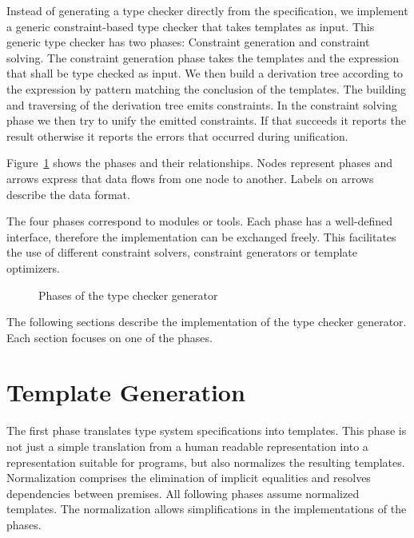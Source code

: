 Instead of generating a type checker directly from the specification,
we implement a generic constraint-based type checker that takes
templates as input. This generic type checker has two phases:
Constraint generation and constraint solving. The constraint
generation phase takes the templates and the expression that shall be
type checked as input. We then build a derivation tree according to
the expression by pattern matching the conclusion of the
templates. The building and traversing of the derivation tree emits
constraints. In the constraint solving phase we then try to unify the
emitted constraints. If that succeeds it reports the result otherwise
it reports the errors that occurred during unification.

Figure~\ref{fig:phases} shows the phases and their
relationships. Nodes represent phases and arrows express that data
flows from one node to another. Labels on arrows describe the data
format.

The four phases correspond to modules or tools. Each phase has a
well-defined interface, therefore the implementation can be exchanged
freely. This facilitates the use of different constraint solvers,
constraint generators or template optimizers.

\begin{figure}
\caption{Phases of the type checker generator}
\label{fig:phases}
\end{figure}

The following sections describe the implementation of the type checker
generator. Each section focuses on one of the phases.

\section{Template Generation}
\label{sec:constraint-templates}
The first phase translates type system specifications into
templates. This phase is not just a simple translation from a human
readable representation into a representation suitable for programs,
but also normalizes the resulting templates. Normalization comprises
the elimination of implicit equalities and resolves dependencies
between premises. All following phases assume normalized templates.
The normalization allows simplifications in the implementations of the
phases.

